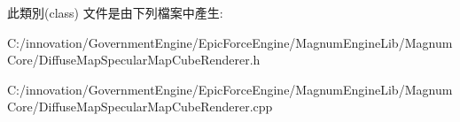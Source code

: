 此類別(class) 文件是由下列檔案中產生\+:\begin{DoxyCompactItemize}
\item 
C\+:/innovation/\+Government\+Engine/\+Epic\+Force\+Engine/\+Magnum\+Engine\+Lib/\+Magnum\+Core/Diffuse\+Map\+Specular\+Map\+Cube\+Renderer.\+h\item 
C\+:/innovation/\+Government\+Engine/\+Epic\+Force\+Engine/\+Magnum\+Engine\+Lib/\+Magnum\+Core/Diffuse\+Map\+Specular\+Map\+Cube\+Renderer.\+cpp\end{DoxyCompactItemize}
